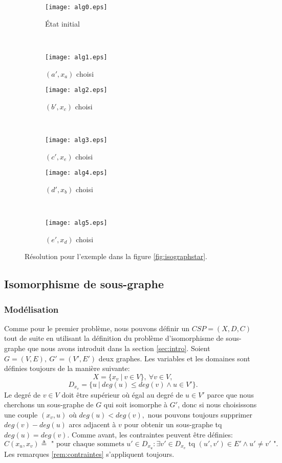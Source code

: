 \documentclass[french]{article}
\theoremstyle{definition}
\theoremstyle{remark}
\begin{document}
\begin{figure*}[t!]
	\begin{subfigure}[t]{0.5\textwidth}
		\centering
		\texttt{[image: alg0.eps]}
		\caption{État initial}
	\end{subfigure}%
	~
	\begin{subfigure}[t]{0.5\textwidth}
		\centering
		\texttt{[image: alg1.eps]}
		\caption{$(a', x_a)$ choisi}
	\end{subfigure}
	
	\begin{subfigure}[t]{0.5\textwidth}
		\centering
		\texttt{[image: alg2.eps]}
		\caption{$(b', x_c)$ choisi}
	\end{subfigure}
	~
	\begin{subfigure}[t]{0.5\textwidth}
		\centering
		\texttt{[image: alg3.eps]}
		\caption{$(c', x_e)$ choisi}
	\end{subfigure}
	
	\begin{subfigure}[t]{0.5\textwidth}
		\centering
		\texttt{[image: alg4.eps]}
		\caption{$(d', x_b)$ choisi}
	\end{subfigure}
	~
	\begin{subfigure}[t]{0.5\textwidth}
		\centering
		\texttt{[image: alg5.eps]}
		\caption{$(e', x_d)$ choisi}
	\end{subfigure}
	\caption{\label{fig:algstar} Résolution pour l'exemple dans la figure \ref{fig:isographstar}.}
\end{figure*}




\newpage
\subsection{Isomorphisme de sous-graphe}
\subsubsection{Modélisation}
Comme pour le premier problème, nous pouvons définir un $CSP=(X, D, C)$ tout de suite en utilisant la définition du problème d'isomorphisme de sous-graphe que nous avons introduit dans la section 
\ref{sec:intro}. Soient $G=(V, E),\ G'=(V', E')$ deux graphes. Les variables et les domaines sont définies toujours de la manière suivante:
$$X=\{x_v\ |\ v \in V \},\ \forall v \in V,$$
$$D_{x_v}=\{u\ |\ deg(u) \leq deg(v) \land u \in V'\}.$$
Le degré de $v \in V$ doit être supérieur où égal au degré de $u \in V'$ parce que nous cherchons un sous-graphe de $G$ qui soit isomorphe à $G'$, donc si nous choisissons une couple $(x_v, u)$ où $deg(u) < deg(v),$ nous pouvons toujours supprimer $deg(v) - deg(u)$ arcs adjacent à $v$ pour obtenir un sous-graphe tq $deg(u) = deg(v).$
Comme avant, les contraintes peuvent être définies:
$$C(x_u, x_v) \triangleq \text{ " pour chaque sommets } u' \in D_{x_u}: \exists v' \in D_{x_v} \text{ tq } (u', v') \in E' \land u' \neq v' \text{ "}.$$
Les remarques \ref{rem:contraintes} s'appliquent toujours.
\end{document}
